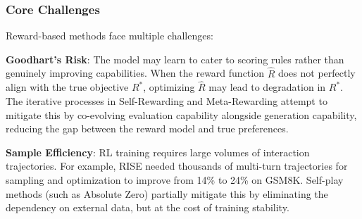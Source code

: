 \begin{table}[htbp]
\centering
\caption{Comparison of reward-based evolution methods.}
\label{tab:reward-compare}
\end{table}

\subsubsection{Core Challenges}

Reward-based methods face multiple challenges:

\textbf{Goodhart's Risk}: The model may learn to cater to scoring rules rather than genuinely improving capabilities. When the reward function $\hat{R}$ does not perfectly align with the true objective $R^*$, optimizing $\hat{R}$ may lead to degradation in $R^*$. The iterative processes in Self-Rewarding and Meta-Rewarding attempt to mitigate this by co-evolving evaluation capability alongside generation capability, reducing the gap between the reward model and true preferences.

\textbf{Sample Efficiency}: RL training requires large volumes of interaction trajectories. For example, RISE needed thousands of multi-turn trajectories for sampling and optimization to improve from 14\% to 24\% on GSM8K. Self-play methods (such as Absolute Zero) partially mitigate this by eliminating the dependency on external data, but at the cost of training stability.

